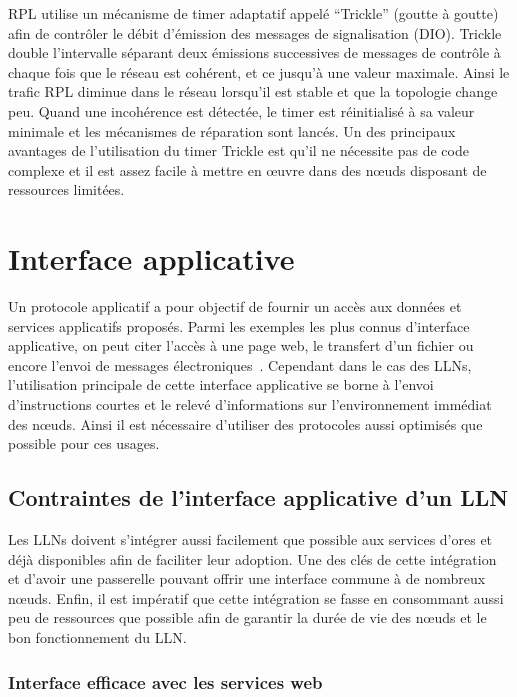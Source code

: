\ac{RPL} utilise un mécanisme de timer adaptatif appelé  ``Trickle'' (goutte à goutte) afin de contrôler le débit d’émission des messages de signalisation (\ac{DIO}).
Trickle double l’intervalle séparant deux émissions successives de messages de contrôle à chaque fois que le réseau est cohérent, et ce jusqu’à une valeur maximale.
Ainsi le trafic \ac{RPL} diminue dans le réseau lorsqu'il est stable et que la topologie change peu.
Quand une incohérence est détectée, le timer est réinitialisé à sa valeur minimale et les mécanismes de réparation sont lancés.
Un des principaux avantages de l’utilisation du timer Trickle est qu’il ne nécessite pas de code complexe et il est assez facile à mettre en œuvre dans des nœuds disposant de ressources limitées.

\section{Interface applicative}
\label{gw:app_layer}

Un protocole applicatif a pour objectif de fournir un accès aux données et services applicatifs proposés.
Parmi les exemples les plus connus d'interface applicative, on peut citer l'accès à une page web, le transfert d'un fichier ou encore l'envoi de messages électroniques~\cite{pujolle2014reseaux}.
Cependant dans le cas des \ac{LLN}s, l'utilisation principale de cette interface applicative se borne à l'envoi d'instructions courtes et le relevé d'informations sur l'environnement immédiat des nœuds.
Ainsi il est nécessaire d'utiliser des protocoles aussi optimisés que possible pour ces usages.

\subsection{Contraintes de l'interface applicative d'un \ac{LLN}}

Les \ac{LLN}s doivent s'intégrer aussi facilement que possible aux services d'ores et déjà disponibles afin de faciliter leur adoption.
Une des clés de cette intégration et d'avoir une passerelle pouvant offrir une interface commune à de nombreux nœuds.
Enfin, il est impératif que cette intégration se fasse en consommant aussi peu de ressources que possible afin de garantir la durée de vie des nœuds et le bon fonctionnement du \ac{LLN}.

\subsubsection{Interface efficace avec les services web}

